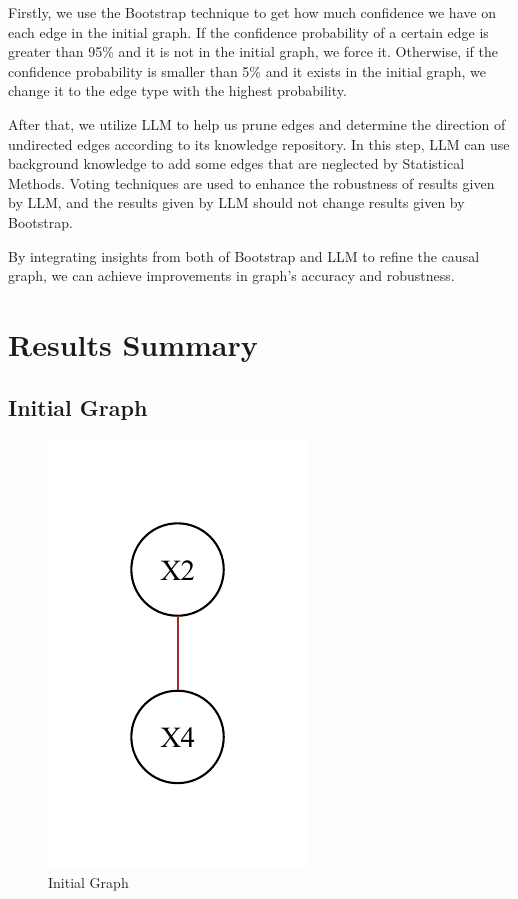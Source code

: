 \documentclass{article}
\begin{document}
Firstly, we use the Bootstrap technique to get how much confidence we have on each edge in the initial graph. If the confidence probability of a certain edge is greater than 95\% and it is not in the initial graph, we force it. Otherwise, if the confidence probability is smaller than 5\% and it exists in the initial graph, we change it to the edge type with the highest probability.

After that, we utilize LLM to help us prune edges and determine the direction of undirected edges according to its knowledge repository. In this step, LLM can use background knowledge to add some edges that are neglected by Statistical Methods. Voting techniques are used to enhance the robustness of results given by LLM, and the results given by LLM should not change results given by Bootstrap.

By integrating insights from both of Bootstrap and LLM to refine the causal graph, we can achieve improvements in graph's accuracy and robustness.

\section{Results Summary}

\subsection{Initial Graph}

\begin{figure}[H]
    \centering
    \includegraphics[height=0.3\textheight]{./demo_data/20241104_155051/Linear_Gaussian_data/output_graph/initial_graph.pdf}
    \caption{Initial Graph}
\end{figure}
\end{document}
